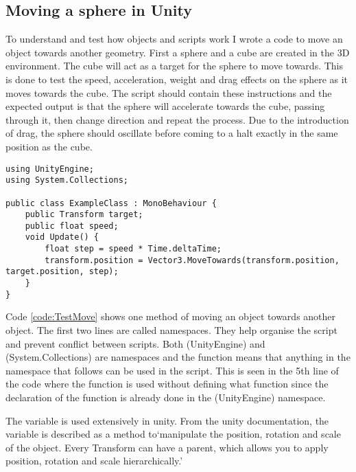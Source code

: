 \subsection{Moving a sphere in Unity}
To understand and test how objects and scripts work I wrote a code to move an object towards another geometry. First a sphere and a cube are created in the 3D environment. The cube will act as a target for the sphere to move towards. This is done to test the speed, acceleration, weight and drag effects on the sphere as it moves towards the cube. The script should contain these instructions and the expected output is that the sphere will accelerate towards the cube, passing through it, then change direction and repeat the process. Due to the introduction of drag, the sphere should oscillate before coming to a halt exactly in the same position as the cube.

\bigskip
\begin{code1}
\begin{verbatim}
using UnityEngine;
using System.Collections;

public class ExampleClass : MonoBehaviour {
    public Transform target;
    public float speed;
    void Update() {
        float step = speed * Time.deltaTime;
        transform.position = Vector3.MoveTowards(transform.position, target.position, step);
    }
}
\end{verbatim}
\label{code:TestMove}
\end{code1}


Code \ref{code:TestMove} shows one method of moving an object towards another object. The first two lines are called namespaces. They help organise the script and prevent conflict between scripts. Both (UnityEngine) and (System.Collections) are namespaces and the  function means that anything in the namespace that follows can be used in the script. This is seen in the 5th line of the code where the  function is used without defining what function since the declaration of the function is already done in the (UnityEngine) namespace.

The  variable is used extensively in unity. From the unity documentation, the  variable is described as a method to`manipulate the position, rotation and scale of the object. Every Transform can have a parent, which allows you to apply position, rotation and scale hierarchically.'


